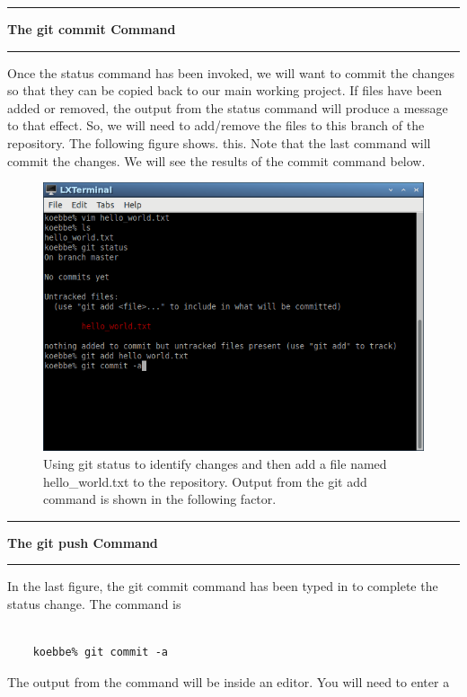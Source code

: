 \documentclass[10pt,fleqn]{article}
\begin{document}
\eject
\vskip0.1in\hrule\vskip0.1in\noindent
{\bf The git commit Command} 
\vskip0.1in\hrule\vskip0.1in\noindent
Once the status command has been invoked, we will want to commit the changes so
that they can be copied back to our main working project. If files have been
added or removed, the output from the status command will produce a message to
that effect. So, we will need to add/remove the files to this branch of the
repository. The following figure shows. this. Note that the last command will 
commit the changes. We will see the results of the commit command below.
\vfill
\begin{figure}[h]
\centering
\includegraphics[width=5.0in]{../images/git_07.png}
\caption{Using git status to identify changes and then add a file named
hello\_world.txt to the repository. Output from the git add command is shown in
the following factor.}
\end{figure}
\eject
\vskip0.1in\hrule\vskip0.1in\noindent
{\bf The git push Command} 
\vskip0.1in\hrule\vskip0.1in\noindent
In the last figure, the git commit command has been typed in to complete the
status change. The command is
\begin{verbatim}

    koebbe% git commit -a

\end{verbatim}
The output from the command will be inside an editor. You will need to enter a
\end{document}
